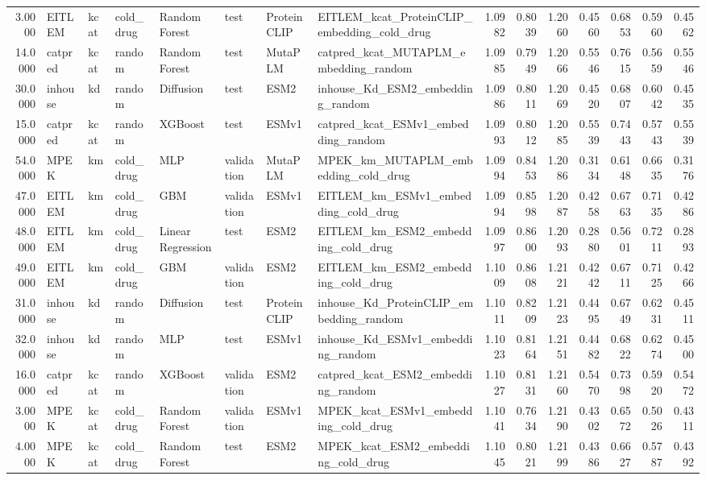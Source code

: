 \begin{tabular}{rlllllllrrrrrrr}
3.0000 & EITLEM & kcat & cold_drug & Random Forest & test & ProteinCLIP & EITLEM_kcat_ProteinCLIP_embedding_cold_drug & 1.0982 & 0.8039 & 1.2060 & 0.4560 & 0.6853 & 0.5960 & 0.4562 \\
14.0000 & catpred & kcat & random & Random Forest & test & MutaPLM & catpred_kcat_MUTAPLM_embedding_random & 1.0985 & 0.7949 & 1.2066 & 0.5546 & 0.7615 & 0.5659 & 0.5546 \\
30.0000 & inhouse & kd & random & Diffusion & test & ESM2 & inhouse_Kd_ESM2_embedding_random & 1.0986 & 0.8011 & 1.2069 & 0.4520 & 0.6807 & 0.6042 & 0.4535 \\
15.0000 & catpred & kcat & random & XGBoost & test & ESMv1 & catpred_kcat_ESMv1_embedding_random & 1.0993 & 0.8012 & 1.2085 & 0.5539 & 0.7443 & 0.5743 & 0.5539 \\
54.0000 & MPEK & km & cold_drug & MLP & validation & MutaPLM & MPEK_km_MUTAPLM_embedding_cold_drug & 1.0994 & 0.8453 & 1.2086 & 0.3134 & 0.6148 & 0.6635 & 0.3176 \\
47.0000 & EITLEM & km & cold_drug & GBM & validation & ESMv1 & EITLEM_km_ESMv1_embedding_cold_drug & 1.0994 & 0.8598 & 1.2087 & 0.4258 & 0.6763 & 0.7135 & 0.4286 \\
48.0000 & EITLEM & km & cold_drug & Linear Regression & test & ESM2 & EITLEM_km_ESM2_embedding_cold_drug & 1.0997 & 0.8600 & 1.2093 & 0.2880 & 0.5601 & 0.7211 & 0.2893 \\
49.0000 & EITLEM & km & cold_drug & GBM & validation & ESM2 & EITLEM_km_ESM2_embedding_cold_drug & 1.1009 & 0.8608 & 1.2121 & 0.4242 & 0.6711 & 0.7125 & 0.4266 \\
31.0000 & inhouse & kd & random & Diffusion & test & ProteinCLIP & inhouse_Kd_ProteinCLIP_embedding_random & 1.1011 & 0.8209 & 1.2123 & 0.4495 & 0.6749 & 0.6231 & 0.4511 \\
32.0000 & inhouse & kd & random & MLP & test & ESMv1 & inhouse_Kd_ESMv1_embedding_random & 1.1023 & 0.8164 & 1.2151 & 0.4482 & 0.6822 & 0.6274 & 0.4500 \\
16.0000 & catpred & kcat & random & XGBoost & validation & ESM2 & catpred_kcat_ESM2_embedding_random & 1.1027 & 0.8131 & 1.2160 & 0.5470 & 0.7398 & 0.5920 & 0.5472 \\
3.0000 & MPEK & kcat & cold_drug & Random Forest & validation & ESMv1 & MPEK_kcat_ESMv1_embedding_cold_drug & 1.1041 & 0.7634 & 1.2190 & 0.4302 & 0.6572 & 0.5026 & 0.4311 \\
4.0000 & MPEK & kcat & cold_drug & Random Forest & test & ESM2 & MPEK_kcat_ESM2_embedding_cold_drug & 1.1045 & 0.8021 & 1.2199 & 0.4386 & 0.6627 & 0.5787 & 0.4392 \\

\end{tabular}
